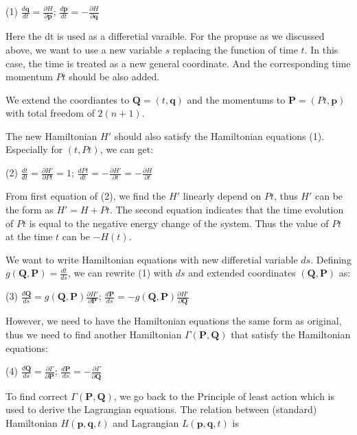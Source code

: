 (1) $ \frac{d \mathbf{q}}{d t} = \frac{\partial H}{\partial \mathbf{p}}$; $ \frac{d \mathbf{p}}{d t} = - \frac{\partial H}{\partial \mathbf{q}} $

Here the dt is used as a differetial varaible. For the propuse as we discussed above, we want to use a new variable $s$ replacing the function of time $t$. In this case, the time is treated as a new general coordinate. And the corresponding time momentum $Pt$ should be also added.

We extend the coordiantes to $ \mathbf{Q} = (t, \mathbf{q}) $ and the momentums to $ \mathbf{P} = (Pt, \mathbf{p})$ with total freedom of $2(n+1)$.

The new Hamiltonian $H'$ should also satisfy the Hamiltonian equations (1). Especially for $(t, Pt)$, we can get\+:

(2) $ \frac{d t}{d t} = \frac{\partial H'}{\partial Pt} = 1 $; $ \frac{d Pt}{d t} = - \frac{\partial H'}{\partial t} = - \frac{\partial H}{\partial t}$

From first equation of (2), we find the $H'$ linearly depend on $Pt$, thus $H'$ can be the form as $ H' = H + Pt $. The second equation indicates that the time evolution of $Pt$ is equal to the negative energy change of the system. Thus the value of $Pt$ at the time $t$ can be $-H(t)$.

We want to write Hamiltonian equations with new differetial variable $ ds$. Defining $ g(\mathbf{Q},\mathbf{P}) = \frac{dt}{ds} $, we can rewrite (1) with $ds$ and extended coordinates $(\mathbf{Q}, \mathbf{P})$ as\+:

(3) $ \frac{d \mathbf{Q}}{d s} = g(\mathbf{Q},\mathbf{P}) \frac{\partial H'}{\partial \mathbf{P}} $; $ \frac{d \mathbf{P}}{d s} = - g(\mathbf{Q},\mathbf{P}) \frac{\partial H'}{\partial \mathbf{Q}} $

However, we need to have the Hamiltonian equations the same form as original, thus we need to find another Hamiltonian $\Gamma(\mathbf{P},\mathbf{Q})$ that satisfy the Hamiltonian equations\+:

(4) $ \frac{d \mathbf{Q}}{d s} = \frac{\partial \Gamma}{\partial \mathbf{P}} $; $ \frac{d \mathbf{P}}{d s} = -\frac{\partial \Gamma}{\partial \mathbf{Q}} $

To find correct $\Gamma(\mathbf{P},\mathbf{Q})$, we go back to the Principle of least action which is used to derive the Lagrangian equations. The relation between (standard) Hamiltonian $H(\mathbf{p},\mathbf{q},t)$ and Lagrangian $L(\mathbf{p},\mathbf{q},t)$ is

